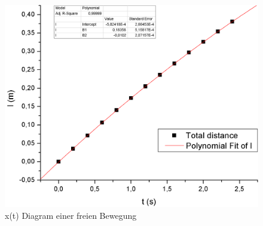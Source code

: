 \documentclass[12pt,a4paper]{article}
\begin{document}
\begin{figure}[H]
	\centering
	\includegraphics[scale=0.4]{./figure/x(t)_diagram_freie_bew.png}
	\caption{x(t) Diagram einer freien Bewegung}
	\label{fig:x_t_freie_bew}
\end{figure}
\end{document}
